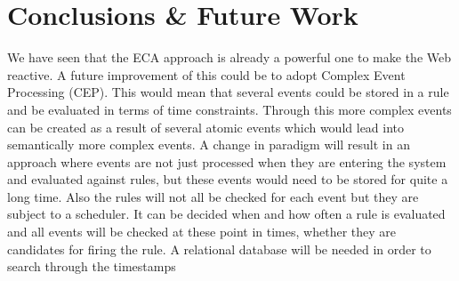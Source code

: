 
\chapter{Conclusions \& Future Work}


%





%
We have seen that the ECA approach is already a powerful one to make the Web reactive.
A future improvement of this could be to adopt Complex Event Processing (CEP).
This would mean that several events could be stored in a rule and be evaluated in terms of time constraints.
Through this more complex events can be created as a result of several atomic events which would lead into semantically more complex events.
A change in paradigm will result in an approach where events are not just processed when they are entering the system and evaluated against rules, but these events would need to be stored for quite a long time.
Also the rules will not all be checked for each event but they are subject to a scheduler.
It can be decided when and how often a rule is evaluated and all events will be checked at these point in times, whether they are candidates for firing the rule.
A relational database will be needed in order to search through the timestamps




